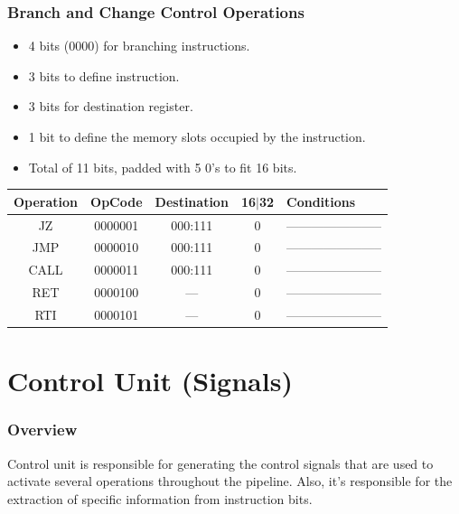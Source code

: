 \documentclass[12pt]{report}
\begin{document}
\section{Branch and Change Control Operations}
\begin{itemize}
    \item 4 bits (0000) for branching instructions.
    \item 3 bits to define instruction.
    \item 3 bits for destination register.
    \item 1 bit to define the memory slots occupied by the instruction.
    \item Total of 11 bits, padded with 5 0's to fit 16 bits. 
\end{itemize}
\begin{center}
 \begin{tabular}{||c| c| c| c| p{40mm}||} 
 \hline
 Operation & OpCode & Destination & 16$|$32 & Conditions  \\ [0.5ex] 
 \hline\hline
 JZ & 0000001 & 000:111 & 0 & ----------------------- \\
 \hline
 JMP & 0000010 & 000:111 & 0 & ----------------------- \\
 \hline
 CALL & 0000011 & 000:111 & 0 & ----------------------- \\
 \hline
 RET & 0000100 & --- & 0 & ----------------------- \\
 \hline
 RTI & 0000101 & --- & 0 & ----------------------- \\
 \hline
\end{tabular}
\end{center}

\part{Control Unit (Signals)}

\section{Overview}
Control unit is responsible for generating the control signals that are used to activate several operations throughout the pipeline. Also, it's responsible for the extraction of specific information from instruction bits.
\end{document}
